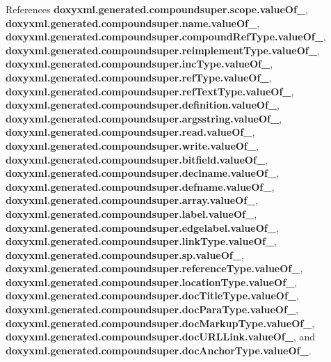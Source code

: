References {\bf doxyxml.\+generated.\+compoundsuper.\+scope.\+value\+Of\+\_\+}, {\bf doxyxml.\+generated.\+compoundsuper.\+name.\+value\+Of\+\_\+}, {\bf doxyxml.\+generated.\+compoundsuper.\+compound\+Ref\+Type.\+value\+Of\+\_\+}, {\bf doxyxml.\+generated.\+compoundsuper.\+reimplement\+Type.\+value\+Of\+\_\+}, {\bf doxyxml.\+generated.\+compoundsuper.\+inc\+Type.\+value\+Of\+\_\+}, {\bf doxyxml.\+generated.\+compoundsuper.\+ref\+Type.\+value\+Of\+\_\+}, {\bf doxyxml.\+generated.\+compoundsuper.\+ref\+Text\+Type.\+value\+Of\+\_\+}, {\bf doxyxml.\+generated.\+compoundsuper.\+definition.\+value\+Of\+\_\+}, {\bf doxyxml.\+generated.\+compoundsuper.\+argsstring.\+value\+Of\+\_\+}, {\bf doxyxml.\+generated.\+compoundsuper.\+read.\+value\+Of\+\_\+}, {\bf doxyxml.\+generated.\+compoundsuper.\+write.\+value\+Of\+\_\+}, {\bf doxyxml.\+generated.\+compoundsuper.\+bitfield.\+value\+Of\+\_\+}, {\bf doxyxml.\+generated.\+compoundsuper.\+declname.\+value\+Of\+\_\+}, {\bf doxyxml.\+generated.\+compoundsuper.\+defname.\+value\+Of\+\_\+}, {\bf doxyxml.\+generated.\+compoundsuper.\+array.\+value\+Of\+\_\+}, {\bf doxyxml.\+generated.\+compoundsuper.\+label.\+value\+Of\+\_\+}, {\bf doxyxml.\+generated.\+compoundsuper.\+edgelabel.\+value\+Of\+\_\+}, {\bf doxyxml.\+generated.\+compoundsuper.\+link\+Type.\+value\+Of\+\_\+}, {\bf doxyxml.\+generated.\+compoundsuper.\+sp.\+value\+Of\+\_\+}, {\bf doxyxml.\+generated.\+compoundsuper.\+reference\+Type.\+value\+Of\+\_\+}, {\bf doxyxml.\+generated.\+compoundsuper.\+location\+Type.\+value\+Of\+\_\+}, {\bf doxyxml.\+generated.\+compoundsuper.\+doc\+Title\+Type.\+value\+Of\+\_\+}, {\bf doxyxml.\+generated.\+compoundsuper.\+doc\+Para\+Type.\+value\+Of\+\_\+}, {\bf doxyxml.\+generated.\+compoundsuper.\+doc\+Markup\+Type.\+value\+Of\+\_\+}, {\bf doxyxml.\+generated.\+compoundsuper.\+doc\+U\+R\+L\+Link.\+value\+Of\+\_\+}, and {\bf doxyxml.\+generated.\+compoundsuper.\+doc\+Anchor\+Type.\+value\+Of\+\_\+}.



